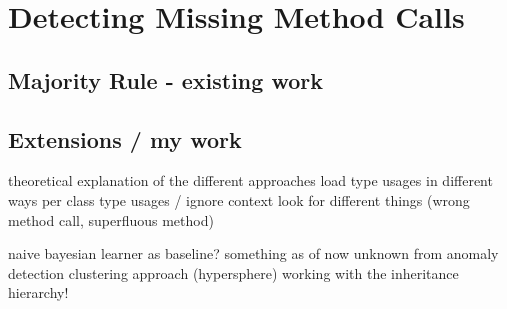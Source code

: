 \chapter{Detecting Missing Method Calls}



\section{Majority Rule - existing work}







\section{Extensions / my work}
theoretical explanation of the different approaches
    load type usages in different ways
        per class type usages / ignore context
    look for different things (wrong method call, superfluous method)

    naive bayesian learner as baseline?
    something as of now unknown from anomaly detection
    clustering approach (hypersphere)
    working with the inheritance hierarchy!


